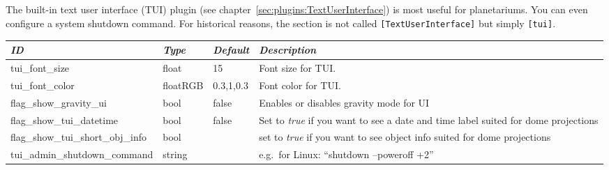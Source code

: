 \subsection{}\label{sec:config.ini:tui}

The built-in text user interface (TUI) plugin (see chapter~\ref{sec:plugins:TextUserInterface}) is most useful for planetariums. You can even configure a system shutdown command. 
For historical reasons, the section is not called \texttt{[TextUserInterface]} but simply \texttt{[tui]}.

\begin{longtabu} to \textwidth {l|l|l|X}\toprule
\emph{ID} & \emph{Type} &\emph{Default}& \emph{Description}\\\midrule
tui\_font\_size           &float    &15       &Font size for TUI.\\\midrule
tui\_font\_color          &floatRGB &0.3,1,0.3&Font color for TUI.\\\midrule
flag\_show\_gravity\_ui   & bool    &false    & Enables or disables gravity mode for UI\\\midrule
flag\_show\_tui\_datetime & bool    &false    &Set to \emph{true} if you want to see a date and time label suited for dome projections\\\midrule
flag\_show\_tui\_short\_obj\_info   & bool&    &set to \emph{true} if you want to see object info suited for dome projections\\\midrule
tui\_admin\_shutdown\_command       & string  && e.g.\ for Linux: ``shutdown --poweroff +2'' \\\bottomrule
\end{longtabu}

\subsection{}\label{sec:config.ini:video}

